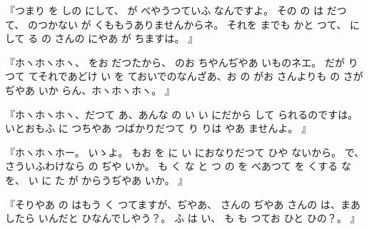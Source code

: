 『つまり
を
しの
にして、
が
べやうつていふ
なんですよ。
その
の
は
だつて、
のつかない
が
くももうありませんからネ。
それを
までも
かと
つて、
にして
る
の
さんの
にやあ
が
ちますは。
』

『ホヽホヽホヽ、
をお
だつたから、
のお
ちやんぢやあ
いものネエ。
だが
り
つて
てそれであどけ
い
を
ておいでのなんざあ、お
の
がお
さんよりも
の
さが
ぢやあ
いか
らん、ホヽホヽホヽ。
』

『ホヽホヽホヽ、だつて
あ、あんな
の
い
い
にだから
して
られるのですは。
いとおもふ
に
つちやあ
つばかりだつて
り
りは
やあ
ませんよ。
』

『ホヽホヽホー。
いゝよ。
もお
を
に
い
におなりだつて
ひや
ないから。
で、さういふわけなら
の
ぢや
いか。
も
く
な
と
つ
の
を
べあつて
を
くする
な
を、
い
に
た
が
からうぢやあ
いか。
』

『そりやあ
の
はもう
く
つてますが、ぢやあ、
さんの
ぢやあ
さんの
は、まあ
したら
いんだと
ひなんでしやう？。
ふ
は
い、
も
も
つてお
ひと
ひの？。
』

